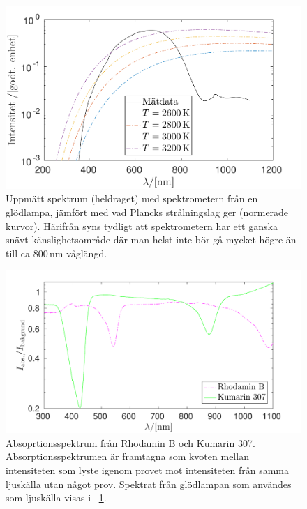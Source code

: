 \documentclass[11pt,a4paper]{article}
\newcommand{\figref}{\figurename~\ref}
\begin{document}
\begin{figure}\centering
\centerline{ %
\includegraphics[width=.9\textwidth]{svartkropp.pdf}
}
\caption{Uppmätt spektrum (heldraget) med spektrometern från en
  glödlampa, jämfört med vad Plancks strålningslag ger (normerade
  kurvor). Härifrån syns tydligt att spektrometern har ett ganska
  snävt känslighetsområde där man helst inte bör gå mycket högre än
  till ca 800\,nm våglängd.}
\label{fig:svartkropp}
\end{figure}

\begin{figure}\centering
\centerline{ %
\includegraphics[width=1\textwidth]{absorption.pdf}
}
\caption{Absoprtionsspektrum från Rhodamin B och Kumarin
  307. Absorptionsspektrumen är framtagna som kvoten mellan
  intensiteten som lyste igenom provet mot intensiteten från samma
  ljuskälla utan något prov. Spektrat från glödlampan som användes som
  ljuskälla visas i \figref{fig:svartkropp}. 
}
\label{fig:absorption} 
\end{figure}
\end{document}
